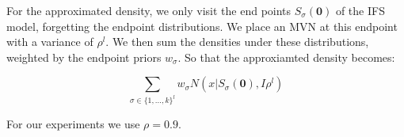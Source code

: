 \documentclass[10pt,a4paper,oneside]{article}
\theoremstyle{definition}
\begin{document}
For the approximated density, we only visit the end points $S_\sigma(\mathbf{0})$ of the IFS model, forgetting the endpoint distributions. We place an MVN at this endpoint with a variance of $\rho^l$. We then sum the densities under these distributions, weighted by the endpoint priors $w_\sigma$. So that the approxiamted density becomes:

\[
\sum_{\sigma \in \{1,\ldots,k\}^l} w_\sigma N(x | S_\sigma(\mathbf{0}), I\rho^l)
\]

For our experiments we use $\rho = 0.9$.



 

\end{document}
